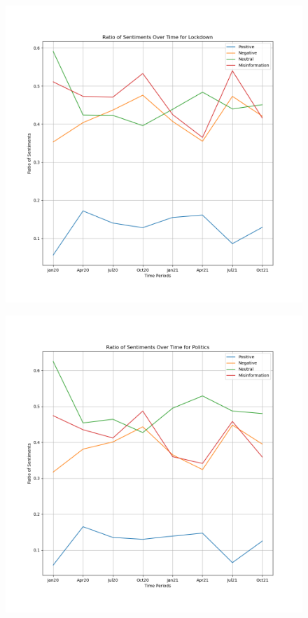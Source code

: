 \documentclass{l4proj}
\begin{document}
\begin{appendices}
\begin{figure}[H]
\begin{minipage}[c]{0.49\linewidth}
\label{fig:ecosen}
\end{minipage}
\end{figure}

\begin{figure}[H]
\begin{minipage}[c]{0.49\linewidth}
\centering
\includegraphics[width=\textwidth]{images/LockdownSentiment.png}
\label{fig:locksen}
\end{minipage}
\begin{minipage}[c]{0.49\linewidth}
\centering
\includegraphics[width=\textwidth]{images/PoliticsSentiment.png}

\end{minipage}
\end{figure}
\end{appendices}
\end{document}
